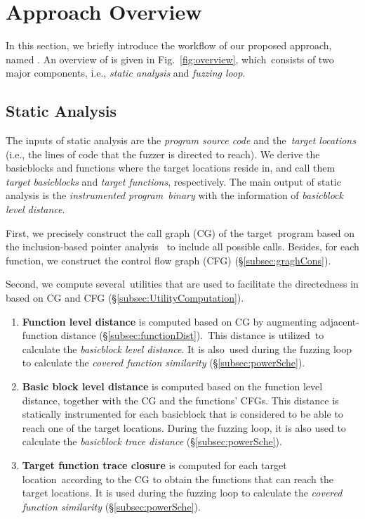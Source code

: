 \section{Approach Overview}

In this section, we briefly introduce the workflow of our proposed approach, named \dFOT. An overview of \dFOT is given in Fig.~\ref{fig:overview}, which~consists of two major components, i.e., \textit{static analysis} and \textit{fuzzing loop}. 



\subsection{Static Analysis}\label{subsec:static_flow}

The inputs of static analysis are the \textit{program source code} and the~\textit{target locations} (i.e., the lines of code that the fuzzer is directed to reach). We derive the basicblocks and functions where the target locations reside in, and call them \textit{target basicblocks} and \textit{target functions}, respectively. The main output of static analysis is the \textit{instrumented program~binary} with the information of \textit{basicblock level distance}.

First, we precisely construct the call graph (CG) of the target~program based on the inclusion-based pointer analysis~\cite{Andersen94programanalysis} to include all possible  calls. Besides, for each function, we construct the  control flow graph (CFG) (\S\ref{subsec:graghCons}).


Second, we compute several~utilities that are used to facilitate the directedness in \dFOT based on CG and CFG (\S\ref{subsec:UtilityComputation}).
\begin{enumerate}[(1)]
\item \textbf{Function level distance} is computed based on CG by augmenting adjacent-function distance (\S\ref{subsec:functionDist}).~This distance is utilized~to calculate the \textit{basicblock level distance}. It is also~used during the fuzzing loop to calculate the \emph{covered function similarity} (\S\ref{subsec:powerSche}).
    
\item \textbf{Basic block level distance} is computed based on the function level distance, together with the CG and the functions' CFGs. This distance is statically instrumented for each basicblock that is considered to be able to reach one of the target locations. During the fuzzing loop, it is also used to calculate the \emph{basicblock trace distance} (\S\ref{subsec:powerSche}).

\item \textbf{Target function trace closure} is computed for each target location~according to the CG to obtain the functions that can reach the target locations. It is used during the fuzzing loop to calculate the \emph{covered function similarity} (\S\ref{subsec:powerSche}).
\end{enumerate}

